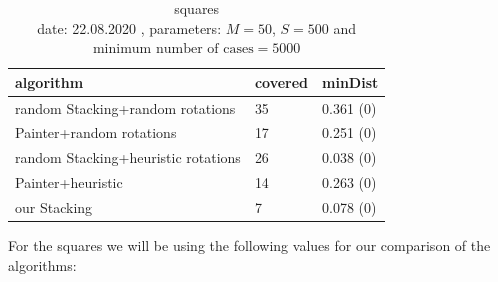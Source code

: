 \documentclass[a4paper,11pt]{article}
\begin{document}
\begin{table}[h]
  \begin{center}
    \begin{tabular}{| l || l | l | }
      \hline
      algorithm                           & covered & minDist \\  %
      \hline

      random Stacking+random rotations    & 35      & 0.361 (0)\\ %

      Painter+random rotations            & 17      & 0.251 (0)\\ %

      random Stacking+heuristic rotations & 26      & 0.038 (0)\\ %

      Painter+heuristic                   & 14      & 0.263 (0)\\ %

      our Stacking                        & 7       & 0.078 (0)\\ %

      \hline
    \end{tabular}
  \end{center}
  \caption{squares\\
    date: 22.08.2020  , parameters: $M=50$, $S=500$ and $\text{minimum number of cases}=5000$  }

\end{table}

For the squares we will be using the following values for our comparison of the algorithms:
\end{document}
